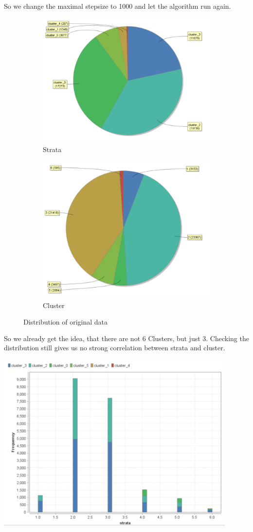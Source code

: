 So we change the maximal stepsize to 1000 and let the algorithm run again.

\begin{figure}[h]
\centering
\begin{subfigure}{.5\textwidth}
  \centering
  \includegraphics[width=.4\linewidth]{../Miriam-RapidMiner/vectorclusteringcluster1000.PNG}
  \caption{Strata}
  \label{fig:OrgSt}
\end{subfigure}%
\begin{subfigure}{.5\textwidth}
  \centering
  \includegraphics[width=.4\linewidth]{../Miriam-RapidMiner/vectorclusteringstrata.PNG}
  \caption{Cluster}
  \label{fig:OrgCl}
\end{subfigure}
\caption{Distribution of original data}
\label{fig:OrgDist}
\end{figure}

So we already get the idea, that there are not 6 Clusters, but just 3. Checking the distribution still gives us no strong correlation between strata and cluster.

\includegraphics[width=0.9\textwidth]{../Miriam-RapidMiner/vectorClustering1000}

